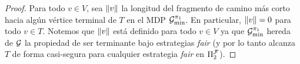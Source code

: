 \begin{proof}

  
  Para todo $v\in V$, sea ${\lVert{v}\rVert}$ la longitud del fragmento de camino más corto hacia algún vértice terminal de $T$ en el MDP
  $\mathcal{G}^{\pi_{1}}_{\min}$.   En particular, ${\lVert{v}\rVert}=0$ para todo $v\in T$.  Notemos que ${\lVert{v}\rVert}$ está definido para todo
  $v\in V$ ya que $\mathcal{G}^{\pi_{1}}_{\min}$ hereda de $\mathcal{G}$ la
  propiedad de ser terminante bajo estrategias \textit{fair} (y por lo tanto alcanza
  $T$ de forma casi-segura para cualquier estrategia \textit{fair} en $\Pi^{\mathcal{F}}_{2}$).
  

\end{proof}
